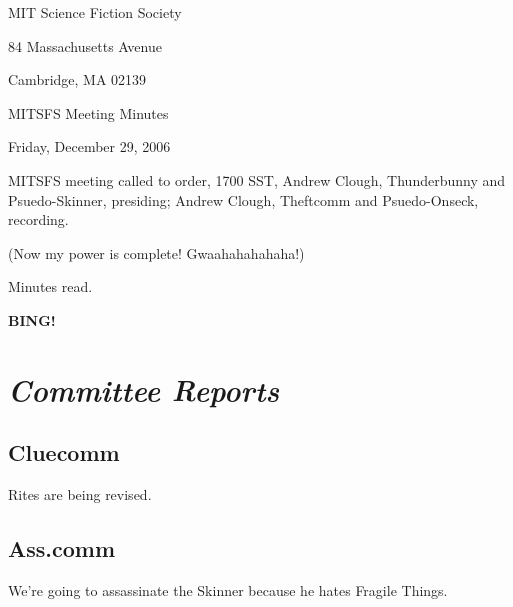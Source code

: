 \documentclass[10pt]{article}
\newcommand{\bing}{{\bf BING!} }
\newcommand{\goto}[1]{\bing \vskip 12pt \section*{{\em{#1}}}}
\begin{document}
\begin{center}

MIT Science Fiction Society

84 Massachusetts Avenue

Cambridge, MA 02139

\vspace{12pt}

MITSFS Meeting Minutes

Friday, December 29, 2006

\end{center}

\vspace{18pt}

\setlength{\parskip}{6pt}

\noindent
MITSFS meeting called to order, 1700 SST,
Andrew Clough, Thunderbunny and Psuedo-Skinner, presiding; Andrew Clough, Theftcomm and Psuedo-Onseck, recording.

(Now my power is complete!  Gwaahahahahaha!)

Minutes read.

\goto{Committee Reports}

\subsection*{Cluecomm}

Rites are being revised.

\subsection*{Ass.comm}

We're going to assassinate the Skinner because he hates Fragile Things.




\end{document}
